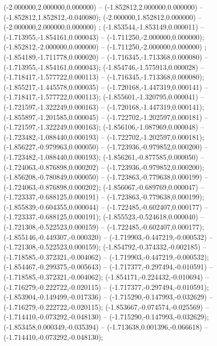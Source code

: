  (-2.000000,2.000000,0.000000) -- (-1.852812,2.000000,0.000000) -- (-1.852812,1.852812,-0.040080);
 (-2.000000,1.852812,0.000000) -- (-2.000000,2.000000,0.000000) ;
 (-1.853544,-1.853149,0.000011) -- (-1.713955,-1.854161,0.000043) -- (-1.711250,-2.000000,0.000000);
 (-1.852812,-2.000000,0.000000) -- (-1.711250,-2.000000,0.000000) ;
 (-1.854189,-1.711778,0.000020) -- (-1.716345,-1.713368,0.000080) -- (-1.713955,-1.854161,0.000043);
 (-1.854746,-1.575913,0.000028) -- (-1.718417,-1.577722,0.000113) -- (-1.716345,-1.713368,0.000080);
 (-1.855217,-1.445578,0.000035) -- (-1.720168,-1.447319,0.000141) -- (-1.718417,-1.577722,0.000113);
 (-1.855601,-1.320795,0.000041) -- (-1.721597,-1.322249,0.000163) -- (-1.720168,-1.447319,0.000141);
 (-1.855897,-1.201585,0.000045) -- (-1.722702,-1.202597,0.000181) -- (-1.721597,-1.322249,0.000163);
 (-1.856106,-1.087969,0.000048) -- (-1.723482,-1.088440,0.000193) -- (-1.722702,-1.202597,0.000181);
 (-1.856227,-0.979963,0.000050) -- (-1.723936,-0.979852,0.000200) -- (-1.723482,-1.088440,0.000193);
 (-1.856261,-0.877585,0.000050) -- (-1.724063,-0.876898,0.000202) -- (-1.723936,-0.979852,0.000200);
 (-1.856208,-0.780849,0.000050) -- (-1.723863,-0.779638,0.000199) -- (-1.724063,-0.876898,0.000202);
 (-1.856067,-0.689769,0.000047) -- (-1.723337,-0.688125,0.000191) -- (-1.723863,-0.779638,0.000199);
 (-1.855839,-0.604355,0.000044) -- (-1.722485,-0.602407,0.000177) -- (-1.723337,-0.688125,0.000191);
 (-1.855523,-0.524618,0.000040) -- (-1.721308,-0.522523,0.000159) -- (-1.722485,-0.602407,0.000177);
 (-1.855146,-0.449307,-0.000320) -- (-1.719903,-0.447219,-0.000532) -- (-1.721308,-0.522523,0.000159);
 (-1.854792,-0.374332,-0.002185) -- (-1.718585,-0.372321,-0.004062) -- (-1.719903,-0.447219,-0.000532);
 (-1.854467,-0.299375,-0.005643) -- (-1.717377,-0.297494,-0.010591) -- (-1.718585,-0.372321,-0.004062);
 (-1.854171,-0.224432,-0.010694) -- (-1.716279,-0.222722,-0.020115) -- (-1.717377,-0.297494,-0.010591);
 (-1.853904,-0.149499,-0.017336) -- (-1.715290,-0.147993,-0.032629) -- (-1.716279,-0.222722,-0.020115);
 (-1.853667,-0.074574,-0.025569) -- (-1.714410,-0.073292,-0.048130) -- (-1.715290,-0.147993,-0.032629);
 (-1.853458,0.000349,-0.035394) -- (-1.713638,0.001396,-0.066618) -- (-1.714410,-0.073292,-0.048130);
